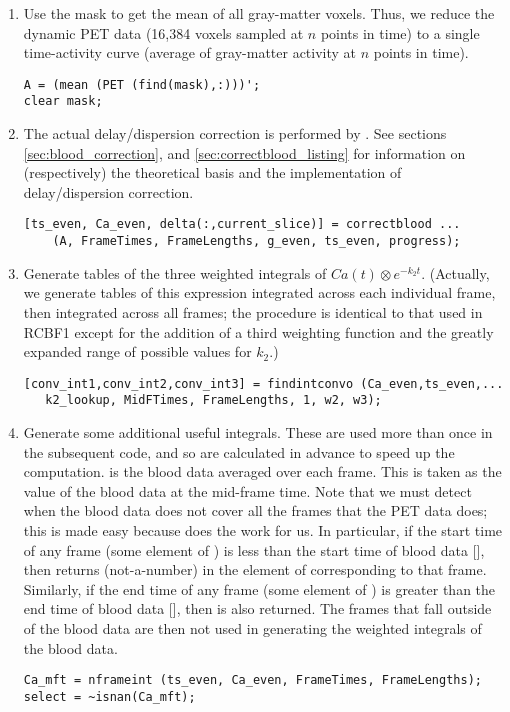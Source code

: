 \begin{enumerate}
\item Use the mask to get the mean of all gray-matter voxels.
  Thus, we reduce the dynamic PET data (16,384 voxels sampled at
  $n$ points in time) to a single time-activity curve (average of
  gray-matter activity at $n$ points in time).
  \begin{verbatim}
A = (mean (PET (find(mask),:)))';
clear mask;
  \end{verbatim}

\item The actual delay/dispersion correction is performed by
  .  See sections \ref{sec:blood_correction}, and
  \ref{sec:correctblood_listing} for information on (respectively) the
  theoretical basis and the implementation of delay/dispersion
  correction.
  \begin{verbatim}
[ts_even, Ca_even, delta(:,current_slice)] = correctblood ...
    (A, FrameTimes, FrameLengths, g_even, ts_even, progress);
  \end{verbatim}

\item Generate tables of the three weighted integrals of $Ca(t)
  \otimes e^{-k_{2}t}$.  (Actually, we generate tables of this
  expression integrated across each individual frame, then integrated
  across all frames; the procedure is identical to that used in RCBF1
  except for the addition of a third weighting function and the
  greatly expanded range of possible values for $k_2$.)
  \begin{verbatim}
[conv_int1,conv_int2,conv_int3] = findintconvo (Ca_even,ts_even,...
   k2_lookup, MidFTimes, FrameLengths, 1, w2, w3);
  \end{verbatim}

\item Generate some additional useful integrals.  These are used more
  than once in the subsequent code, and so are calculated in advance
  to speed up the computation.   is the blood data
  averaged over each frame.  This is taken as the value of the blood
  data at the mid-frame time.  Note that we must detect when the blood
  data does not cover all the frames that the PET data does; this is
  made easy because  does the work for us.  In
  particular, if the start time of any frame (some element of
  ) is less than the start time of blood data
  [], then  returns 
  (not-a-number) in the element of  corresponding to that
  frame.  Similarly, if the end time of any frame (some element of
  ) is greater than the end time of
  blood data [], then 
  is also returned.  The frames that fall outside of the blood data
  are then not used in generating the weighted integrals of the blood data.
\begin{verbatim}
Ca_mft = nframeint (ts_even, Ca_even, FrameTimes, FrameLengths);      
select = ~isnan(Ca_mft);


\end{verbatim}
\end{enumerate}
